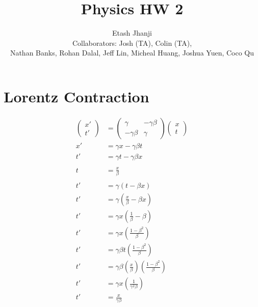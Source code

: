 \documentclass[11pt,letterpaper, twocolumn]{article}
\author{Etash Jhanji\\\small Collaborators: Josh (TA), Colin (TA), \\\small Nathan Banks, Rohan Dalal, Jeff Lin, Micheal Huang, Joshua Yuen, Coco Qu}
\title{Physics HW 2}
\begin{document}
\maketitle

\section{Lorentz Contraction}
\begin{align*}
    \begin{pmatrix}x'\\t'\end{pmatrix} &= \begin{pmatrix}\gamma & -\gamma\beta\\ -\gamma\beta & \gamma\end{pmatrix}\begin{pmatrix}x\\t\end{pmatrix} \\
    x'&= \gamma x - \gamma\beta t\\
    t'&= \gamma t - \gamma\beta x\\\\
    t &= \frac{x}{\beta}\\\\
    t' &= \gamma (t-\beta x)\\
    t' &= \gamma \left(\frac{x}{\beta} - \beta x\right)\\
    t' &= \gamma x \left(\frac{1}{\beta} - \beta \right)\\
    t' &= \gamma x \left(\frac{1-\beta^2}{\beta}\right)\\
    t' &= \gamma \beta t \left(\frac{1-\beta^2}{\beta}\right)\\
    t' &= \gamma \beta \left(\frac{x}{\beta}\right) \left(\frac{1-\beta^2}{\beta}\right)\\
    t' &= \gamma x \left(\frac{1}{\gamma^2\beta}\right)\\
    t' &= \frac{x}{\gamma\beta}
\end{align*}
\end{document}
